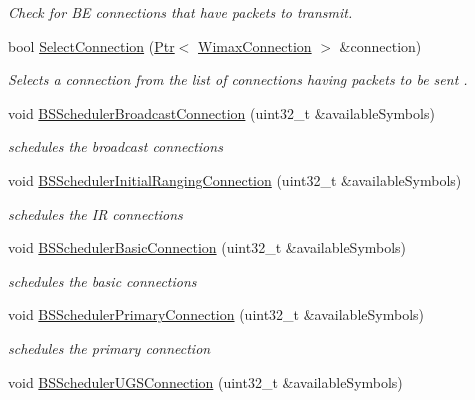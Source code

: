 \begin{DoxyCompactItemize}
\begin{DoxyCompactList}\small\item\em Check for BE connections that have packets to transmit. \end{DoxyCompactList}\item 
bool \hyperlink{classns3_1_1BSSchedulerRtps_a082c11be23b996ed560dcb76ce8db3a2}{Select\+Connection} (\hyperlink{classns3_1_1Ptr}{Ptr}$<$ \hyperlink{classns3_1_1WimaxConnection}{Wimax\+Connection} $>$ \&connection)
\begin{DoxyCompactList}\small\item\em Selects a connection from the list of connections having packets to be sent . \end{DoxyCompactList}\item 
void \hyperlink{classns3_1_1BSSchedulerRtps_ad041a6417c9cf0ddc40116ac877015ab}{B\+S\+Scheduler\+Broadcast\+Connection} (uint32\+\_\+t \&available\+Symbols)
\begin{DoxyCompactList}\small\item\em schedules the broadcast connections \end{DoxyCompactList}\item 
void \hyperlink{classns3_1_1BSSchedulerRtps_aa679d00c7063da179a3d2401e4a37f8e}{B\+S\+Scheduler\+Initial\+Ranging\+Connection} (uint32\+\_\+t \&available\+Symbols)
\begin{DoxyCompactList}\small\item\em schedules the IR connections \end{DoxyCompactList}\item 
void \hyperlink{classns3_1_1BSSchedulerRtps_a9245c54c83bcde5e7178dacbbfc745c6}{B\+S\+Scheduler\+Basic\+Connection} (uint32\+\_\+t \&available\+Symbols)
\begin{DoxyCompactList}\small\item\em schedules the basic connections \end{DoxyCompactList}\item 
void \hyperlink{classns3_1_1BSSchedulerRtps_a2bd7697f2451b3fa6865c858e7c2556f}{B\+S\+Scheduler\+Primary\+Connection} (uint32\+\_\+t \&available\+Symbols)
\begin{DoxyCompactList}\small\item\em schedules the primary connection \end{DoxyCompactList}\item 
void \hyperlink{classns3_1_1BSSchedulerRtps_a71243a521e00bd88f39b681a0f14ed91}{B\+S\+Scheduler\+U\+G\+S\+Connection} (uint32\+\_\+t \&available\+Symbols)

\end{DoxyCompactItemize}
